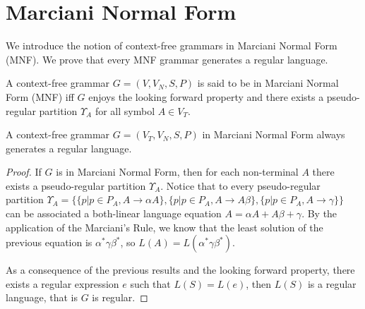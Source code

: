 \section{Marciani Normal Form}
\label{sec:marciani-normal-form}

We introduce the notion of context-free grammars in Marciani Normal Form (MNF). 
We prove that every MNF grammar generates a regular language.

\begin{definition}
	\label{dfn:mnf}
	A context-free grammar $G=(V,V_{N},S,P)$ is said to be in Marciani Normal Form (MNF) iff $G$ enjoys the looking forward property and there exists a pseudo-regular partition $\Upsilon_{A}$ for all symbol $A\in V_{T}$.
\end{definition}

\begin{theorem}
	\label{thm:mnf}	
	A context-free grammar $G=(V_{T},V_{N},S,P)$ in Marciani Normal Form always generates a regular language.
	
	\begin{proof}
		If $G$ is in Marciani Normal Form, then for each non-terminal $A$ there exists a pseudo-regular partition $\Upsilon_{A}$. 
		Notice that to every pseudo-regular partition $\Upsilon_{A}=\{\{p|p\in P_{A},A\rightarrow\alpha A\},\{p|p\in P_{A},A\rightarrow A\beta\},\{p|p\in P_{A},A\rightarrow\gamma\}\}$ can be associated a both-linear language equation $A=\alpha A+A\beta+\gamma$.
		By the application of the Marciani's Rule, we know that the least solution of the previous equation is $\alpha^{*}\gamma\beta^{*}$,
		so $L(A)=L(\alpha^{*}\gamma\beta^{*})$.
		
		As a consequence of the previous results and the looking forward property, there exists a regular expression $e$ such that $L(S)=L(e)$, then $L(S)$ is a regular language, that is $G$ is regular.
	\end{proof}
\end{theorem}